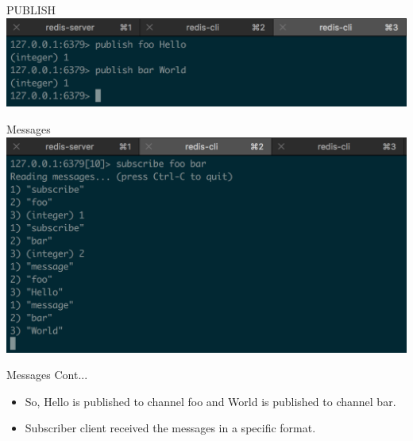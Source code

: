 \documentclass[10pt]{beamer}
\begin{document}
\begin{frame}[fragile]{PUBLISH}
  \includegraphics[scale=0.5]{img/publish}
\end{frame}

\begin{frame}[fragile]{Messages}
  \includegraphics[scale=0.5]{img/subscriber-messages}
\end{frame}

\begin{frame}[fragile]{Messages Cont...}
  \begin{itemize}
    \item So, Hello is published to channel foo and World is published to
    channel bar.
    \item Subscriber client received the messages in a specific format.
  \end{itemize}
\end{frame}
\end{document}
